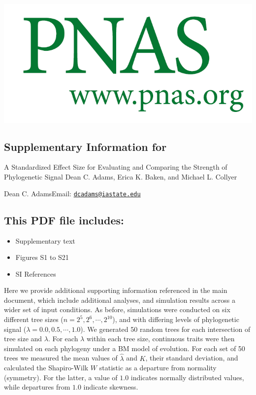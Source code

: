 \documentclass[
]{article}
\author{}
\date{\vspace{-2.5em}}
\providecommand{\tightlist}{%
  \setlength{\itemsep}{0pt}\setlength{\parskip}{0pt}}
\begin{document}
\includegraphics[width=0.95\linewidth]{SI-Title} \hfill\break
\hfill\break

\hypertarget{supplementary-information-for}{%
\subsection{Supplementary Information
for}\label{supplementary-information-for}}

\hfill\break

A Standardized Effect Size for Evaluating and Comparing the Strength of
Phylogenetic Signal \hfill\break \hfill\break Dean C. Adams, Erica K.
Baken, and Michael L. Collyer \hfill\break

\hfill\break

Dean C. Adams\hfill\break Email:
\href{mailto:dcadams@iastate.edu}{\nolinkurl{dcadams@iastate.edu}}\hfill\break

\hypertarget{this-pdf-file-includes}{%
\subsection{This PDF file includes:}\label{this-pdf-file-includes}}

\hfill\break

\begin{itemize}
\tightlist
\item
  Supplementary text
\item
  Figures S1 to S21
\item
  SI References
\end{itemize}

\newpage

Here we provide additional supporting information referenced in the main
document, which include additional analyses, and simulation results
across a wider set of input conditions. As before, simulations were
conducted on six different tree sizes (\(n=2^5, 2^6, \cdots, 2^{10}\)),
and with differing levels of phylogenetic signal
(\(\lambda=0.0, 0.5, \cdots, 1.0\)). We generated 50 random trees for
each intersection of tree size and \(\lambda\). For each \(\lambda\)
within each tree size, continuous traits were then simulated on each
phylogeny under a BM model of evolution. For each set of 50 trees we
measured the mean values of \(\hat{\lambda}\) and \(K\), their standard
deviation, and calculated the Shapiro-Wilk \(W\) statistic as a
departure from normality (symmetry). For the latter, a value of \(1.0\)
indicates normally distributed values, while departures from \(1.0\)
indicate skewness.
\end{document}

